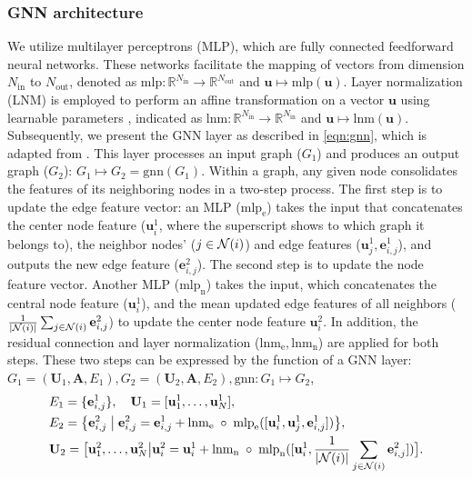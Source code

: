 \documentclass{article}
\begin{document}
\subsubsection{GNN architecture}
\label{sec:GNN}
\label{sec:gnncompo}
We utilize multilayer perceptrons (MLP), which are fully connected feedforward neural networks. These networks facilitate the mapping of vectors from dimension $N_{\mathrm{in}}$ to $N_{\mathrm{out}}$, denoted as $\mathrm{mlp}:\mathbb{R}^{N_{\mathrm{in}}}\rightarrow\mathbb{R}^{N_{\mathrm{out}}}$ and $\mathbf{u}\mapsto\mathrm{mlp}(\mathbf{u})$. Layer normalization (LNM) is employed to perform an affine transformation on a vector $\mathbf{u}$ using learnable parameters \cite{ba2016layer}, indicated as $\mathrm{lnm}:\mathbb{R}^{N_{\mathrm{in}}}\rightarrow\mathbb{R}^{N_{\mathrm{in}}}$ and $ \mathbf{u}\mapsto\mathrm{lnm}(\mathbf{u})$. Subsequently, we present the GNN layer as described in \eqref{eqn:gnn}, which is adapted from \cite{pfaff2020learning}. This layer processes an input graph ($G_1$) and produces an output graph ($G_2$): $G_1\mapsto G_2=\mathrm{gnn}(G_1)$. Within a graph, any given node consolidates the features of its neighboring nodes in a two-step process. The first step is to update the edge feature vector: an MLP ($\mathrm{mlp}_\mathrm{e}$) takes the input that concatenates the center node feature ($\mathbf{u}^1_i$, where the superscript shows to which graph it belongs to), the neighbor nodes' ($j\in\mathcal{N}(i)$) and edge features ($\mathbf{u}^1_j,\mathbf{e}^1_{i,j}$), and outputs the new edge feature ($\mathbf{e}^2_{i,j}$). The second step is to update the node feature vector. Another MLP ($\mathrm{mlp}_\mathrm{n}$) takes the input, which concatenates the central node feature ($\mathbf{u}_i^1$), and the mean updated edge features of all neighbors ($\frac{1}{|\mathcal{N}(i)|}\sum_{j\in\mathcal{N}(i)}\mathbf{e}^2_{i,j}$) to update the center node feature $\mathbf{u}^2_i$. In addition, the residual connection and layer normalization ($\mathrm{lnm}_\mathrm{e},\mathrm{lnm}_\mathrm{n}$) are applied for both steps. These two steps can be expressed by the function of a GNN layer: $G_1 = (\mathbf{U}_1, \mathbf{A}, E_1), G_2 = (\mathbf{U}_2, \mathbf{A}, E_2),\mathrm{gnn}:G_1 \mapsto G_2$,  
\begin{equation}
\begin{split}
&E_1 = \{\mathbf{e}_{i,j}^{1}\},\quad\mathbf{U}_1 = [\mathbf{u}^{1}_1,\dots,\mathbf{u}^{1}_N],
\\
&E_2 = \big\{ \mathbf{e}_{i,j}^2 \;\big|\;  \mathbf{e}^2_{i,j} = \mathbf{e}^1_{i,j}+\mathrm{lnm}_\mathrm{e}\;\circ\;\mathrm{mlp}_\mathrm{e}([\mathbf{u}_i^1, \mathbf{u}_j^1, \mathbf{e}_{i,j}^1])                 \big\},\\
&\mathbf{U}_2 = \big[\mathbf{u}^2_1,\dots,\mathbf{u}^2_N\big|
\mathbf{u}_i^2=\mathbf{u}_i^1+\mathrm{lnm}_\mathrm{n}\;\circ\;\mathrm{mlp}_\mathrm{n}([\mathbf{u}_i^1,\frac{1}{|\mathcal{N}(i)|}\sum_{j\in\mathcal{N}(i)}\mathbf{e}^2_{i,j}])
\big].
\end{split}
\label{eqn:gnn}
\end{equation}
\end{document}
